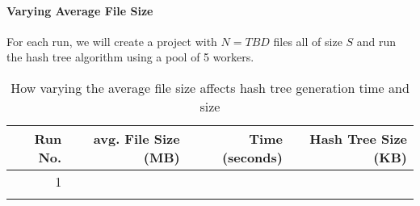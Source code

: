 \paragraph*{Varying Average File Size}
For each run, we will create a project with $N=TBD$ files all of size $S$ and run the hash tree algorithm using a pool of 5 workers.

\begin{longtable}{ | r | r | r | r | }
  \hline
  \textbf{Run No.} & \textbf{avg. File Size (MB)} & \textbf{Time (seconds)} & \textbf{Hash Tree Size (KB)}\\\hline
  1
  &
  &
  &
  \\\hline
  \caption{How varying the average file size affects hash tree generation time and size}
\end{longtable}

 
